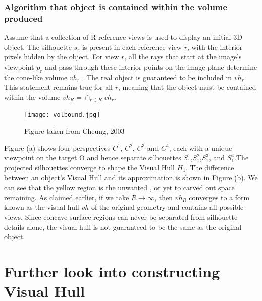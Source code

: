 \documentclass[a4paper]{report}
\begin{document}
\subsubsection{Algorithm that object is contained within the volume produced}

Assume that a collection of R reference views is used to display an initial 3D object. The silhouette \(s_r\) is present in each reference view \(r\), with the interior pixels hidden by the object. For view \(r\), all the rays that start at the image's viewpoint \(p_r\) and pass through these interior points on the image plane determine the cone-like volume \({vh}_r\) . The real object is guaranteed to be included in \({vh}_r\). This statement remains true for all \(r\), meaning that the object must be contained within the volume \( {{vh}_R} = {\cap_{r\in R}vh_{r} }\).
\newline

\begin{figure}
\texttt{[image: volbound.jpg]} 
\caption{Figure taken
from Cheung, 2003 \cite{Cheung:2003}}
\label{fig:voxelgrid}
\end{figure}
Figure (a) shows four perspectives \(C^1\), \(C^2\), \(C^3\) and \(C^4\), each with a unique viewpoint on the target O and hence separate silhouettes \(S_1^1\),\(S_1^2\),\(S_1^3\), and \(S_1^4\).The projected silhouettes converge to shape the Visual Hull \(H_1\). The difference between an object's Visual Hull and its approximation is shown in Figure (b). We can see that the yellow region is the unwanted , or yet to carved out space remaining. As claimed earlier, if we take \(R \rightarrow \infty \), then \({vh}_R\) converges to a form known as the visual hull \(vh\) of the original geometry and contains all possible views. Since concave surface regions can never be separated from silhouette details alone, the visual hull is not guaranteed to be the same as the original object.
\clearpage
\newpage
\section{Further look into constructing Visual Hull}
\end{document}
